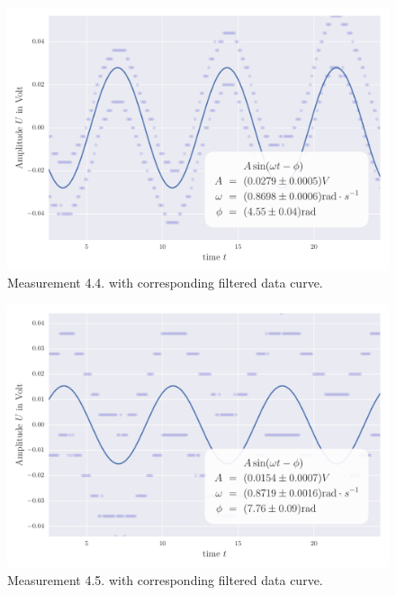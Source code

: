\begin{figure}[H]
    \centering
    \includegraphics[width=0.7\linewidth]{analysis/figures/fit4_4}
    \caption{Measurement 4.4. with corresponding filtered data curve.}
    \label{fig:4_4_plot}
\end{figure}
\begin{figure}[H]
    \centering
    \includegraphics[width=0.7\linewidth]{analysis/figures/fit4_5}
    \caption{Measurement 4.5. with corresponding filtered data curve.}
    \label{fig:4_5_plot}
\end{figure}


